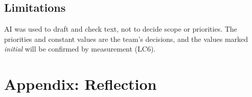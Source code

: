 \documentclass[12pt]{article}
\begin{document}
\subsection{Limitations}
AI was used to draft and check text, not to decide scope or priorities. The
priorities and constant values are the team's decisions, and the values
marked \emph{initial} will be confirmed by measurement (LC6).

\newpage{}

\section{Appendix:  Reflection}




\end{document}
